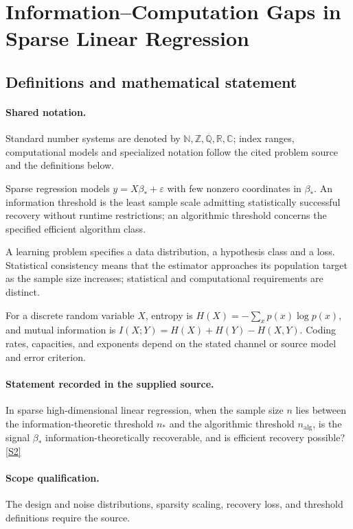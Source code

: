 \documentclass[11pt]{article}
\newcommand{\sref}[2]{\hyperlink{source:#1:#2}{[S#2]}}
\begin{document}
\section{Information–Computation Gaps in Sparse Linear Regression}\label{statement}

\subsection{Definitions and mathematical statement}

\paragraph{Shared notation.}Standard number systems are denoted by $\mathbb N,\mathbb Z,\mathbb Q,\mathbb R,\mathbb C$; index ranges, computational models and specialized notation follow the cited problem source and the definitions below.


Sparse regression models $y=X\beta_*+\varepsilon$ with few nonzero coordinates in $\beta_*$. An information threshold is the least sample scale admitting statistically successful recovery without runtime restrictions; an algorithmic threshold concerns the specified efficient algorithm class.

A learning problem specifies a data distribution, a hypothesis class and a loss. Statistical consistency means that the estimator approaches its population target as the sample size increases; statistical and computational requirements are distinct.

For a discrete random variable $X$, entropy is $H(X)=-\sum_xp(x)\log p(x)$, and mutual information is $I(X;Y)=H(X)+H(Y)-H(X,Y)$. Coding rates, capacities, and exponents depend on the stated channel or source model and error criterion.
\paragraph{Statement recorded in the supplied source.}
In sparse high-dimensional linear regression, when the sample size $n$ lies between the information-theoretic threshold $n_*$ and the algorithmic threshold $n_{\mathrm{alg}}$, is the signal $\beta_*$ information-theoretically recoverable, and is efficient recovery possible? \sref{statement}{2}
\paragraph{Scope qualification.}
The design and noise distributions, sparsity scaling, recovery loss, and threshold definitions require the source.
\end{document}
